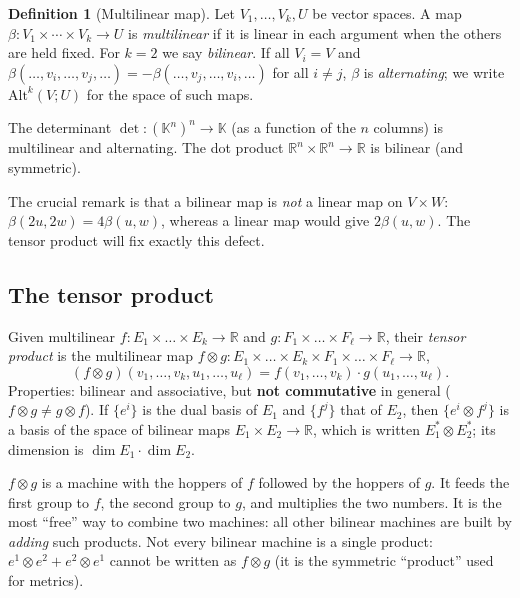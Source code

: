 \documentclass[11pt,a4paper]{article}
\newcounter{thm}[section]
\numberwithin{equation}{section}
\theoremstyle{definition}
\newtheorem{definition}[thm]{Definition}
\theoremstyle{plain}
\newcommand{\R}{\mathbb{R}}
\newcommand{\K}{\mathbb{K}}
\newcommand{\Alt}{\mathrm{Alt}}                    %
\begin{document}
\begin{definition}[Multilinear map]
Let $V_1,\dots,V_k,U$ be vector spaces. A map $\beta:V_1\times\cdots\times V_k\to U$ is
\emph{multilinear} if it is linear in each argument when the others are held fixed.
For $k=2$ we say \emph{bilinear}. If all $V_i=V$ and
$\beta(\dots,v_i,\dots,v_j,\dots)=-\beta(\dots,v_j,\dots,v_i,\dots)$ for all $i\neq j$,
$\beta$ is \emph{alternating}; we write $\Alt^k(V;U)$ for the space of such maps.
\end{definition}

\begin{example}
The determinant $\det:(\K^n)^n\to\K$ (as a function of the $n$ columns) is multilinear and alternating.
The dot product $\R^n\times\R^n\to\R$ is bilinear (and symmetric).
\end{example}

The crucial remark is that a bilinear map is \emph{not} a linear map on $V\times W$:
$\beta(2u,2w)=4\beta(u,w)$, whereas a linear map would give $2\beta(u,w)$. The tensor product
will fix exactly this defect.


\subsection{The tensor product}\label{sec:tensorproduct}
\begin{formal}
Given multilinear $f:E_1\times\dots\times E_k\to\R$ and $g:F_1\times\dots\times F_\ell\to\R$, their \emph{tensor product} is the multilinear map $f\otimes g:E_1\times\dots\times E_k\times F_1\times\dots\times F_\ell\to\R$,
\[
(f\otimes g)(v_1,\dots,v_k,u_1,\dots,u_\ell)=f(v_1,\dots,v_k)\cdot g(u_1,\dots,u_\ell).
\]
Properties: bilinear and associative, but \textbf{not commutative} in general ($f\otimes g\ne g\otimes f$). If $\{e^{i}\}$ is the dual basis of $E_1$ and $\{f^{j}\}$ that of $E_2$, then $\{e^{i}\otimes f^{j}\}$ is a basis of the space of bilinear maps $E_1\times E_2\to\R$, which is written $E_1^*\otimes E_2^*$; its dimension is $\dim E_1\cdot\dim E_2$.
\end{formal}

\begin{intuition}
$f\otimes g$ is a machine with the hoppers of $f$ followed by the hoppers of $g$. It feeds the first group to $f$, the second group to $g$, and multiplies the two numbers. It is the most ``free'' way to combine two machines: all other bilinear machines are built by \emph{adding} such products. Not every bilinear machine is a single product: $e^{1}\otimes e^{2}+e^{2}\otimes e^{1}$ cannot be written as $f\otimes g$ (it is the symmetric ``product'' used for metrics).
\end{intuition}
\end{document}
